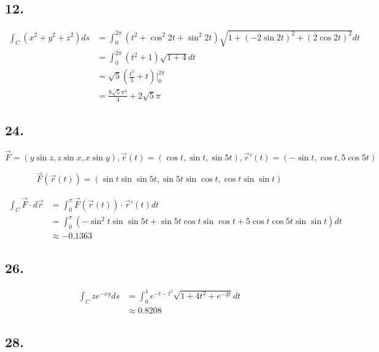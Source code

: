 \documentclass{article}
\begin{document}
  \subsection*{12. }

  $$\begin{aligned}
    \int_C (x^2 + y^2 + z^2) ds &= \int_0^{2\pi} (t^2 + \cos^2 2t + \sin^2 2t) \sqrt{1 + (-2\sin 2t)^2 + (2\cos 2t)^2} dt \\
    &= \int_0^{2\pi} (t^2 + 1) \sqrt{1 + 4} dt \\
    &= \sqrt 5 (\frac{t^3}{3} + t)\biggl|_0^{2\pi} \\
    &= \frac{8\sqrt 5\pi^3}{3} + 2\sqrt 5\pi
  \end{aligned}$$

  \subsection*{24. }

  $\overrightarrow{F} = (y\sin z, z \sin x, x \sin y), \overrightarrow{r}(t) = (\cos t, \sin t, \sin 5t), \overrightarrow r'(t) = (-\sin t, \cos t, 5\cos 5t)$

  $$\overrightarrow{F}(\overrightarrow{r}(t)) = (\sin t \sin \sin 5t, \sin 5t \sin \cos t, \cos t \sin \sin t)$$

  $$\begin{aligned}
    \int_C \overrightarrow{F} \cdot d\overrightarrow{r} &= \int_0^{\pi} \overrightarrow{F}(\overrightarrow{r}(t)) \cdot \overrightarrow{r}'(t) dt \\
    &= \int_0^\pi (-\sin^2 t \sin \sin 5t + \sin 5t \cos t \sin \cos t +  5\cos t \cos 5t \sin \sin t) dt \\
    &\approx -0.1363
  \end{aligned}$$

  \subsection*{26. }

  $$\begin{aligned}
    \int_C ze^{-xy} ds &= \int_0^1 e^{-t-t^3}\sqrt{1 + 4t^2 + e^{-2t}} dt \\
    &\approx 0.8208
  \end{aligned}$$

  \subsection*{28. }
\end{document}
